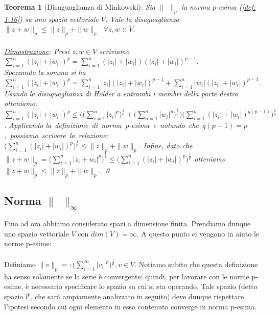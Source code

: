 \documentclass[a4paper,12pt]{report}
\newtheorem{teorema}{Teorema}[chapter]
\begin{document}
\vspace{1em}

\begin{teorema}[Disuguaglianza di Minkowski]\label{thm: 2.3}
    Sia $\| \ \ \|_p$ la norma p-esima (\ref{def: 1.16}) su uno spazio vettoriale $V$. Vale la disuguaglianza $\|z+w\|_p\leq\|z\|_p+\|w\|_p \ \ \ \forall z,w \in V$.
    \\
    \\ \underline{Dimostrazione}: Presi $z,w \in V$ scriviamo $\displaystyle\sum_{i=1}^n(|z_i|+|w_i|)^p=\sum_{i=1}^n(|z_i|+|w_i|)(|z_i|+|w_i|)^{p-1}$.
    \\Spezzando la somma si ha \mbox{$\displaystyle\sum_{i=1}^n(|z_i|+|w_i|)^p=\sum_{i=1}^n|z_i|(|z_i|+|w_i|)^{p-1}+\sum_{i=1}^n|w_i|(|z_i|+|w_i|)^{p-1}$}. Usando la disuguaglianza di Hölder a entrambi i membri della parte destra otteniamo:
    \\ $\displaystyle\sum_{i=1}^n(|z_i|+|w_i|)^p\leq\bigg(\bigg(\sum_{i=1}^n|z_i|^p\bigg)^{\frac{1}{p}}+\bigg(\sum_{n=1}^n|w_i|^p\bigg)^{\frac{1}{p}}\bigg)\bigg(\sum_{i=1}^n(|z_i|+|w_i|)^{q(p-1)}\bigg)^{\frac{1}{q}}$. Applicando \mbox{la definizione di norma p-esima e notando che $q(p-1)=p$, possiamo scrivere la relazione:}
    \\ $\bigg(\displaystyle\sum_{i=1}^n(|z_i|+|w_i|)^p\bigg)^{\frac{1}{p}}\leq\|z\|_p+\|w\|_p$. Infine, dato che $\|z+w\|_p=\bigg(\displaystyle\sum_{i=1}^n|z_i+w_i|^p\bigg)^{\frac{1}{p}}\leq\bigg(\displaystyle\sum_{i=1}^n(|z_i|+|w_i|)^p\bigg)^{\frac{1}{p}}$ otteniamo $\|z+w\|_p\leq\|z\|_p+\|w\|_p$. \qed
\end{teorema}

\subsection{Norma $\| \ \ \|_{\infty}$}\label{2.1.3}

Fino ad ora abbiamo considerato spazi a dimensione finita. Prendiamo dunque uno spazio vettoriale $V$ con $dim(V)=\infty$. A questo punto ci vengono in aiuto le norme p-esime:
\\
\\ Definiamo $\| v\|_p=:\bigg(\displaystyle\sum_{i=1}^{\infty}|v_i|^p\bigg)^{\frac{1}{p}}, v\in V$. Notiamo subito che questa definizione ha senso solamente se la serie è convergente; quindi, per lavorare con le norme p-esime, è necessario specificare lo spazio su cui si sta operando. Tale spazio (detto spazio $l^p$, che sarà ampiamente analizzato in seguito) deve dunque rispettare l'ipotesi secondo cui ogni elemento in esso contenuto converge in norma p-esima.
\end{document}
